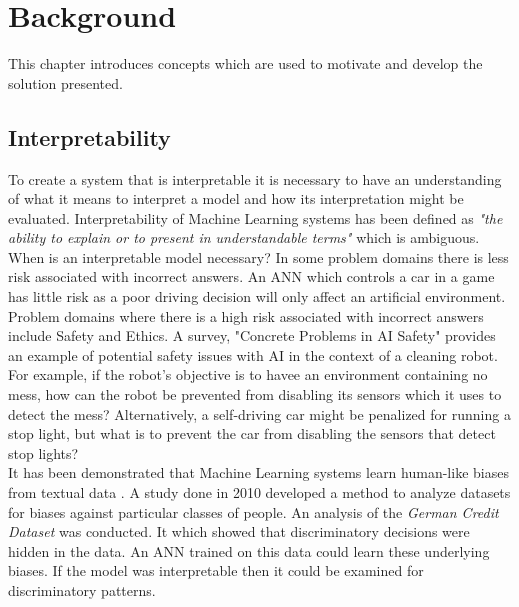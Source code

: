 \chapter{Background}\label{C:backgroundsurvey}
This chapter introduces concepts which are used to motivate and develop the solution presented.

\section{Interpretability}
To create a system that is interpretable it is necessary to have an understanding of what it means to interpret a model and how its interpretation might be evaluated. Interpretability of Machine Learning systems has been defined as \textit{"the ability to explain or to present in understandable terms"} \cite{doshi2017towards} which is ambiguous.\\

When is an interpretable model necessary? \cite{doshi2017towards} In some problem domains there is less risk associated with incorrect answers. An ANN which controls a car in a game has little risk as a poor driving decision will only affect an artificial environment. Problem domains where there is a high risk associated with incorrect answers include Safety and Ethics. A survey, "Concrete Problems in AI Safety" \cite{amodei2016concrete} provides an example of potential safety issues with AI in the context of a cleaning robot.  For example, if the robot's objective is to havee an environment containing no mess, how can the robot be prevented from disabling its sensors which it uses to detect the mess? Alternatively, a self-driving car might be penalized for running a stop light, but what is to prevent the car from disabling the sensors that detect stop lights?\\

It has been demonstrated that Machine Learning systems learn human-like biases from textual data \cite{caliskan2017semantics}. A study done in 2010 \cite{ruggieri2010data} developed a method to analyze datasets for biases against particular classes of people. An analysis of the \textit{German Credit Dataset} was conducted. It which showed that discriminatory decisions were hidden in the data. An ANN trained on this data could learn these underlying biases. If the model was interpretable then it could be examined for discriminatory patterns.\\

